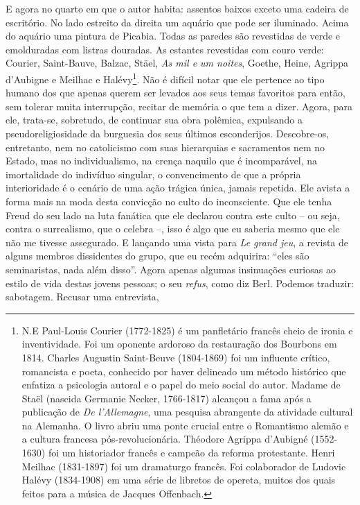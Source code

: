 E agora no quarto em que o autor habita: assentos baixos exceto uma
cadeira de escritório. No lado estreito da direita um aquário que pode
ser iluminado. Acima do aquário uma pintura de Picabia. Todas as paredes
são revestidas de verde e emolduradas com listras douradas. As estantes
revestidas com couro verde: Courier, Saint-Bauve, Balzac, Stäel,
\emph{As mil e um noites}, Goethe, Heine, Agrippa d'Aubigne e Meilhac e
Halévy\footnote{N.E Paul-Louis Courier (1772-1825) é um panfletário
  francês cheio de ironia e inventividade. Foi um oponente ardoroso da
  restauração dos Bourbons em 1814. Charles Augustin Saint-Beuve
  (1804-1869) foi um influente crítico, romancista e poeta, conhecido
  por haver delineado um método histórico que enfatiza a psicologia
  autoral e o papel do meio social do autor. Madame de Staël (nascida
  Germanie Necker, 1766-1817) alcançou a fama após a publicação de
  \emph{De l'Allemagne}, uma pesquisa abrangente da atividade cultural
  na Alemanha. O livro abriu uma ponte crucial entre o Romantismo alemão
  e a cultura francesa pós-revolucionária. Théodore Agrippa d'Aubigné
  (1552-1630) foi um historiador francês e campeão da reforma
  protestante. Henri Meilhac (1831-1897) foi um dramaturgo francês. Foi
  colaborador de Ludovic Halévy (1834-1908) em uma série de libretos de
  opereta, muitos dos quais feitos para a música de Jacques Offenbach.}.
Não é difícil notar que ele pertence ao tipo humano dos que apenas
querem ser levados aos seus temas favoritos para então, sem tolerar
muita interrupção, recitar de memória o que tem a dizer. Agora, para
ele, trata-se, sobretudo, de continuar sua obra polêmica, expulsando a
pseudoreligiosidade da burguesia dos seus últimos esconderijos.
Descobre-os, entretanto, nem no catolicismo com suas hierarquias e
sacramentos nem no Estado, mas no individualismo, na crença naquilo que
é incomparável, na imortalidade do indivíduo singular, o convencimento
de que a própria interioridade é o cenário de uma ação trágica única,
jamais repetida. Ele avista a forma mais na moda desta convicção no
culto do inconsciente. Que ele tenha Freud do seu lado na luta fanática
que ele declarou contra este culto -- ou seja, contra o surrealismo, que
o celebra --, isso é algo que eu saberia mesmo que ele não me tivesse
assegurado. E lançando uma vista para \emph{Le grand jeu}, a revista de
alguns membros dissidentes do grupo, que eu recém adquirira: ``eles são
seminaristas, nada além disso''. Agora apenas algumas insinuações
curiosas ao estilo de vida destas jovens pessoas; o seu \emph{refus},
como diz Berl. Podemos traduzir: sabotagem. Recusar uma entrevista,
